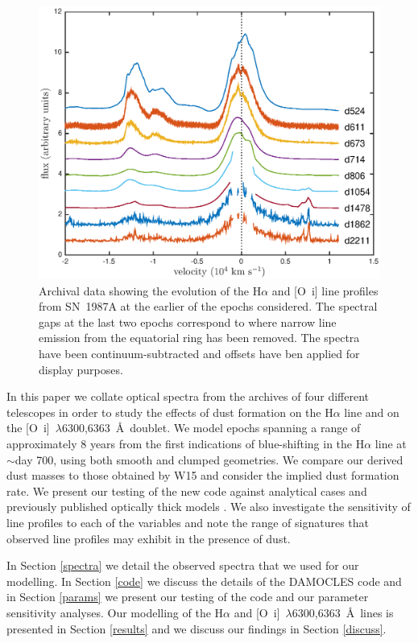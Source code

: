 \documentclass[useAMS,usenatbib,usegraphicx]{mnras}
\begin{document}
\begin{figure}
\includegraphics[trim =39 10 45 15,clip=true,scale=0.51]{Ha_evol_early_1col2}
\caption{Archival data showing the evolution of the H$\alpha$ and
[O~{\sc i}] line profiles from SN~1987A at the earlier of the epochs considered. The 
spectral gaps at the last two epochs correspond to where narrow line 
emission from the equatorial ring has been removed. The spectra have been
continuum-subtracted and offsets have ben applied for display purposes.}
\label{Ha_evol_early}
\end{figure}

In this paper we collate optical spectra from the archives of four 
different telescopes in order to study the effects of dust formation on 
the H$\alpha$ line and on the [O~{\sc i}]~$\lambda$6300,6363~\AA\ doublet.  
We model epochs spanning a range of approximately 8 years 
from the first indications of blue-shifting in the H$\alpha$ line at 
$\sim$day 700, using both smooth and clumped geometries.  We compare our 
derived dust masses to those obtained by W15 and consider the implied dust
formation rate.  We present our testing of the new code against 
analytical cases and previously published optically thick models \citep{Lucy1989}. 
We also investigate 
the sensitivity of line profiles to each of the variables and 
 note the range of signatures that observed line profiles may exhibit 
in the presence of dust.

In Section \ref{spectra} we detail the observed spectra that we used for our 
modelling.  In Section \ref{code} we discuss the details of the DAMOCLES 
code and in Section \ref{params} we present our testing of the code and our parameter sensitivity 
analyses.  Our modelling of the H$\alpha$ and 
[O~{\sc i}]~$\lambda$6300,6363~\AA\ lines is presented in Section 
\ref{results} and  we discuss our findings in Section \ref{discuss}.
\end{document}
